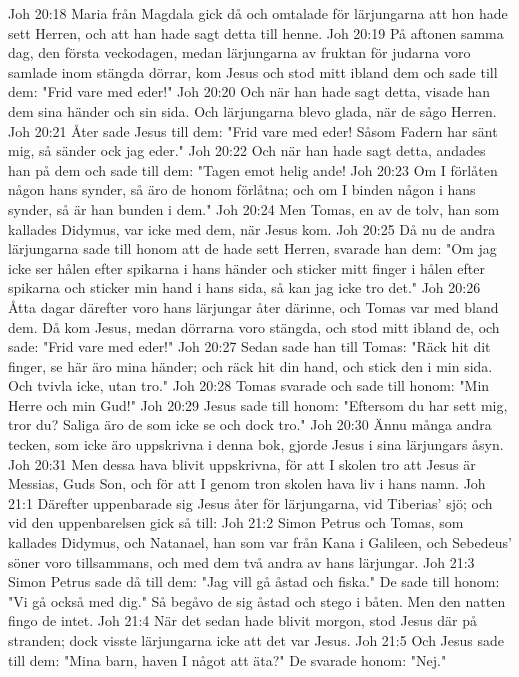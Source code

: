 Joh 20:18  Maria från Magdala gick då och omtalade för lärjungarna att hon hade sett Herren, och att han hade sagt detta till henne.
Joh 20:19  På aftonen samma dag, den första veckodagen, medan lärjungarna av fruktan för judarna voro samlade inom stängda dörrar, kom Jesus och stod mitt ibland dem och sade till dem: "Frid vare med eder!"
Joh 20:20  Och när han hade sagt detta, visade han dem sina händer och sin sida. Och lärjungarna blevo glada, när de sågo Herren.
Joh 20:21  Åter sade Jesus till dem: "Frid vare med eder! Såsom Fadern har sänt mig, så sänder ock jag eder."
Joh 20:22  Och när han hade sagt detta, andades han på dem och sade till dem: "Tagen emot helig ande!
Joh 20:23  Om I förlåten någon hans synder, så äro de honom förlåtna; och om I binden någon i hans synder, så är han bunden i dem."
Joh 20:24  Men Tomas, en av de tolv, han som kallades Didymus, var icke med dem, när Jesus kom.
Joh 20:25  Då nu de andra lärjungarna sade till honom att de hade sett Herren, svarade han dem: "Om jag icke ser hålen efter spikarna i hans händer och sticker mitt finger i hålen efter spikarna och sticker min hand i hans sida, så kan jag icke tro det."
Joh 20:26  Åtta dagar därefter voro hans lärjungar åter därinne, och Tomas var med bland dem. Då kom Jesus, medan dörrarna voro stängda, och stod mitt ibland de, och sade: "Frid vare med eder!"
Joh 20:27  Sedan sade han till Tomas: "Räck hit dit finger, se här äro mina händer; och räck hit din hand, och stick den i min sida. Och tvivla icke, utan tro."
Joh 20:28  Tomas svarade och sade till honom: "Min Herre och min Gud!"
Joh 20:29  Jesus sade till honom: "Eftersom du har sett mig, tror du? Saliga äro de som icke se och dock tro."
Joh 20:30  Ännu många andra tecken, som icke äro uppskrivna i denna bok, gjorde Jesus i sina lärjungars åsyn.
Joh 20:31  Men dessa hava blivit uppskrivna, för att I skolen tro att Jesus är Messias, Guds Son, och för att I genom tron skolen hava liv i hans namn.
Joh 21:1  Därefter uppenbarade sig Jesus åter för lärjungarna, vid Tiberias' sjö; och vid den uppenbarelsen gick så till:
Joh 21:2  Simon Petrus och Tomas, som kallades Didymus, och Natanael, han som var från Kana i Galileen, och Sebedeus' söner voro tillsammans, och med dem två andra av hans lärjungar.
Joh 21:3  Simon Petrus sade då till dem: "Jag vill gå åstad och fiska." De sade till honom: "Vi gå också med dig." Så begåvo de sig åstad och stego i båten. Men den natten fingo de intet.
Joh 21:4  När det sedan hade blivit morgon, stod Jesus där på stranden; dock visste lärjungarna icke att det var Jesus.
Joh 21:5  Och Jesus sade till dem: "Mina barn, haven I något att äta?" De svarade honom: "Nej."
